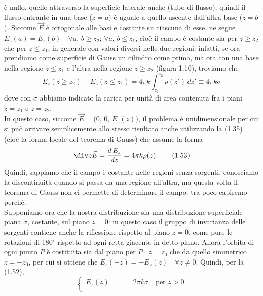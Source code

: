 \begin{enumerate}
    \`e nullo, quello attraverso la superficie laterale anche (tubo di flusso),
    quindi il flusso entrante in una base ($z=a$) \`e uguale a quello uscente
    dall'altra base ($z=b$). Siccome $\vec E$ \`e ortogonale alle basi e
    costante su ciascuna di esse, ne segue
    $E_z(a)=E_z(b)\quad\forall a,\,b\ge z_2$; $\forall a,\,b\le z_1$, cio\`e il
    campo \`e costante sia per $z\ge z_2$ che per $z\le z_1$, in generale con
    valori diversi nelle due regioni: infatti, se ora prendiamo come superficie
    di Gauss un cilindro come prima, ma ora con una base nella regione
    $z\le z_1$ e l'altra nella regione $z\ge z_2$ (figura 1.10), troviamo che
    \begin{equation}
      E_z(z\ge z_2)-E_z(z\le z_1)=4\pi k\int_{z_1}^{z_2}\rho(z')\,dz'
      \equiv4\pi k\sigma
      \tag{1.52}
    \end{equation}
    dove con $\sigma$ abbiamo indicato la carica per unit\`a di area contenuta
    fra i piani $z=z_1$ e $z=z_2$.\\
    In questo caso, siccome $\vec E=\big(0,\,0,\,E_z(z)\big)$, il problema \`e
    unidimensionale per cui si pu\`o arrivare semplicemente allo stesso
    risultato anche utilizzando la (1.35) (cio\`e la forma locale del teorema di
    Gauss) che assume la forma
    \begin{equation}
      \dive\vec E=\frac{d\,E_z}{dz}=4\pi k\rho(z).
      \tag{1.53}
    \end{equation}
    Quindi, sappiamo che il campo \`e costante nelle regioni senza sorgenti,
    conosciamo la discontinuit\`a quando si passa da una regione all'altra, ma
    questa volta il teorema di Gauss non ci permette di determinare il campo:
    tra poco capiremo perch\'e.\\
    Supponiamo ora che la nostra distribuzione sia una distribuzione
    superficiale piana $\sigma$, costante, sul piano $z=0$: in questo caso il
    gruppo di invarianza delle sorgenti contiene anche la riflessione rispetto
    al piano $z=0$, come pure le rotazioni di 180$^\circ$ rispetto ad ogni retta
    giacente in detto piano. Allora l'orbita di ogni punto $P$ \`e costituita
    sia dal piano per $P$ \ $z=z_0$ che da quello simmetrico $z=-z_0$, per cui
    si ottiene che $E_z(-z)=-E_z(z)\quad\forall z\neq0$. Quindi, per la (1.52),
    \begin{equation}
      \left\{\begin{aligned}
        E_z(z)&=\phantom{-}2\pi k\sigma\quad\text{per }z>0\\

\end{aligned}
\end{equation}
\end{enumerate}
